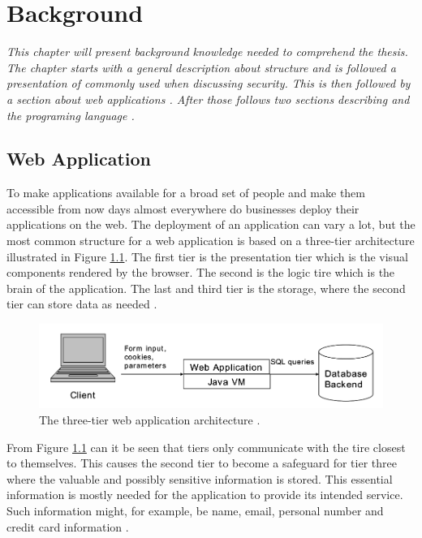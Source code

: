 \chapter{Background}
\label{Background}
\textit{This chapter will present background knowledge needed to comprehend the thesis. The chapter starts with a general description about \textit{} structure and is followed a presentation of \textit{} commonly used when discussing security. This is then followed by a section about  web applications \textit{}. After those follows two sections describing \textit{} and the programing language \textit{}.}



\section{Web Application}
\label{WebApplication}
To make applications available for a broad set of people and make them accessible from now days almost everywhere do businesses deploy their applications on the web. The deployment of an application can vary a lot, but the most common structure for a web application is based on a three-tier architecture illustrated in Figure \ref{fig:webApplication-Haldar}. The first tier is the presentation tier which is the visual components rendered by the browser. The second is the logic tire which is the brain of the application. The last and third tier is the storage, where the second tier can store data as needed \parencite{JustinClarke-Salt2009SIAa}.

\begin{figure}[H]
  \centering
  \includegraphics[width=\textwidth]{images/webApplication-Haldar.png}
  \caption{The three-tier web application architecture \cite{Haldar}.}
  \label{fig:webApplication-Haldar}
\end{figure}

From Figure \ref{fig:webApplication-Haldar} can it be seen that tiers only communicate with the tire closest to themselves. This causes the second tier to become a safeguard for tier three where the valuable and possibly sensitive information is stored. This essential information is mostly needed for the application to provide its intended service. Such information might, for example, be name, email, personal number and credit card information \parencite{JustinClarke-Salt2009SIAa}.

